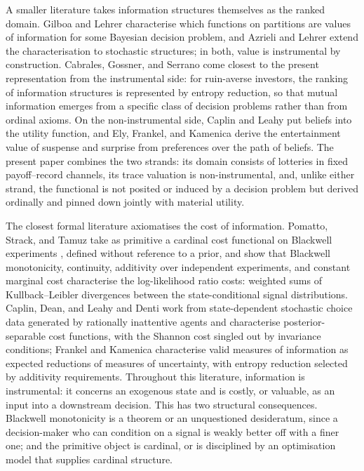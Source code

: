 \documentclass[11pt,a4paper]{article}
\theoremstyle{definition}
\newcommand{\1}{\mathbf 1}
\begin{document}
A smaller literature takes information structures themselves as the ranked domain.  Gilboa and Lehrer
\cite{GilboaLehrer1991} characterise which functions on partitions are values of information for some Bayesian
decision problem, and Azrieli and Lehrer \cite{AzrieliLehrer2008} extend the characterisation to stochastic
structures; in both, value is instrumental by construction.  Cabrales, Gossner, and Serrano
\cite{CabralesGossnerSerrano2013} come closest to the present representation from the instrumental side: for
ruin-averse investors, the ranking of information structures is represented by entropy reduction, so that mutual
information emerges from a specific class of decision problems rather than from ordinal axioms.  On the
non-instrumental side, Caplin and Leahy \cite{CaplinLeahy2001} put beliefs into the utility function, and Ely, Frankel,
and Kamenica \cite{ElyFrankelKamenica2015} derive the entertainment value of suspense and surprise from preferences
over the path of beliefs.  The present paper combines the two strands: its domain consists of lotteries in fixed
payoff--record channels, its trace valuation is non-instrumental, and, unlike either strand, the functional is not
posited or induced by a decision problem but derived ordinally and pinned down jointly with material utility.

The closest formal literature axiomatises the cost of information.  Pomatto, Strack, and Tamuz
\cite{PomattoStrackTamuz2023} take as primitive a cardinal cost functional on Blackwell experiments
\cite{Blackwell1953}, defined without reference to a prior, and show that Blackwell monotonicity, continuity,
additivity over independent experiments, and constant marginal cost characterise the log-likelihood ratio costs:
weighted sums of Kullback--Leibler divergences between the state-conditional signal distributions.  Caplin, Dean, and
Leahy \cite{CaplinDeanLeahy2022} and Denti \cite{Denti2022} work from state-dependent stochastic choice data generated
by rationally inattentive agents and characterise posterior-separable cost functions, with the Shannon cost singled
out by invariance conditions; Frankel and Kamenica \cite{FrankelKamenica2019} characterise valid measures of
information as expected reductions of measures of uncertainty, with entropy reduction selected by additivity
requirements.  Throughout this literature, information is instrumental: it concerns an exogenous state and is costly,
or valuable, as an input into a downstream decision.  This has two structural consequences.  Blackwell monotonicity is
a theorem or an unquestioned desideratum, since a decision-maker who can condition on a signal is weakly better off
with a finer one; and the primitive object is cardinal, or is disciplined by an optimisation model that supplies
cardinal structure.
\end{document}
